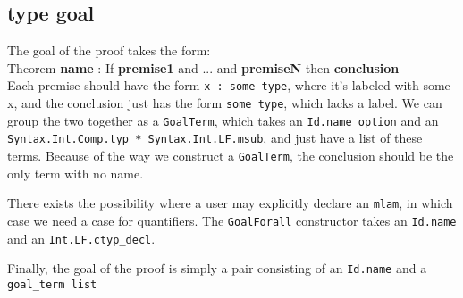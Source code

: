 \documentclass[11pt]{article}
\begin{document}
\subsection{type goal}
The goal of the proof takes the form:\\
Theorem \textbf{name} : If \textbf{premise1} and ... and \textbf{premiseN} then \textbf{conclusion}\\
Each premise should have the form \verb+x : some type+, where it's labeled with some x, and the conclusion just has the form \verb+some type+, which lacks a label. We can group the two together as a \verb+GoalTerm+, which takes an \verb+Id.name option+ and an \verb+Syntax.Int.Comp.typ * Syntax.Int.LF.msub+, and just have a list of these terms. Because of the way we construct a \verb+GoalTerm+, the conclusion should be the only term with no name.

There exists the possibility where a user may explicitly declare an \verb+mlam+, in which case we need a case for quantifiers. The \verb+GoalForall+ constructor takes an \verb+Id.name+ and an \verb+Int.LF.ctyp_decl+.

Finally, the goal of the proof is simply a pair consisting of an \verb+Id.name+ and a \verb+goal_term list+
\end{document}
